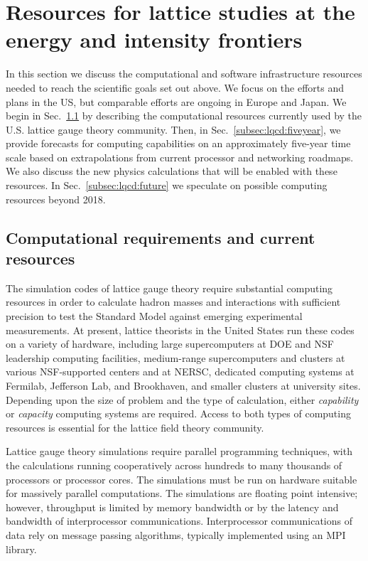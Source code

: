 \section{Resources for lattice studies at the energy and intensity frontiers}
\label{sec:lqcd:resources}

In this section we discuss the computational and software infrastructure resources needed to reach the scientific goals set out above.
We focus on the efforts and plans in the US, but comparable efforts are ongoing in Europe and Japan.  We begin in Sec.~\ref{subsec:lqcd:current} by describing the computational resources currently used by the U.S. lattice gauge theory community.  Then, in Sec.~\ref{subsec:lqcd:fiveyear}, we provide forecasts for computing capabilities on an approximately five-year time scale based on extrapolations from current processor and networking roadmaps.  We also discuss the new physics calculations that will be enabled with these resources.  In Sec.~\ref{subsec:lqcd:future} we speculate on possible computing resources beyond 2018.

\subsection{Computational requirements and current resources}
\label{subsec:lqcd:current}

The simulation codes of lattice gauge theory require substantial computing
resources in order to calculate hadron masses and interactions with sufficient
precision to test the Standard Model against emerging experimental
measurements.  At present, lattice theorists in the United States run these
codes on a variety of hardware, including large supercomputers at DOE and NSF
leadership computing facilities, medium-range supercomputers and clusters at
various NSF-supported centers and at NERSC, dedicated computing systems at
Fermilab, Jefferson Lab, and Brookhaven, and smaller clusters at university
sites.  Depending upon the size of problem and the type of calculation, either
{\em capability} or {\em capacity} computing systems are required.  Access to
both types of computing resources is essential for the lattice field theory
community.

Lattice gauge theory simulations require parallel programming techniques, with
the calculations running cooperatively across hundreds to many thousands of
processors or processor cores.  The simulations must be run on hardware suitable
for massively parallel computations. The simulations are floating point intensive;
however, throughput is limited by memory bandwidth or by the latency and
bandwidth of interprocessor communications. Interprocessor communications of
data rely on message passing algorithms, typically implemented using an
MPI~\cite{MPI} library.

